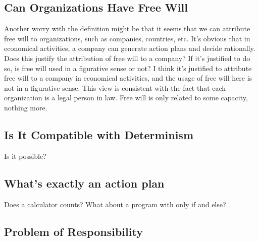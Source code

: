\subsection{Can Organizations Have Free Will}

Another worry with the definition might be that it seems that we can attribute free will to organizations, such as companies, countries, etc. It’s obvious that in economical activities, a company can generate action plans and decide rationally. Does this justify the attribution of free will to a company? If it’s justified to do so, is free will used in a figurative sense or not? I think it’s justified to attribute free will to a company in economical activities, and the usage of free will here is not in a figurative sense. This view is consistent with the fact that each organization is a legal person in law. Free will is only related to some capacity, nothing more.

\subsection{Is It Compatible with Determinism}

Is it possible?

\subsection{What's exactly an action plan}

Does a calculator counts? What about a program with only if and else?

\subsection{Problem of Responsibility}
